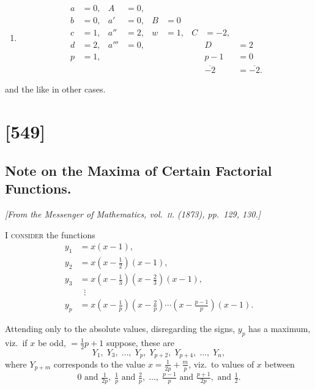 \documentclass[11pt,a4paper]{book}
\begin{document}
\begin{enumerate}
And so if instead of the tubular figure, annulus with three radii, we had a
tubular figure, annulus with diameter, then

\item
\begin{align*}
a &= 0, & A &= 0, \\
b &= 0, & a' &= 0, & B &= 0 \\
c &= 1, & a'' &= 2, & w &= 1, & C &= -2, \\
d &= 2, & a''' &= 0, & & & & D &= 2 \\
p &= 1, & & & & & & p - 1 &= 0 \\[2pt]
& & & & & & & \overline{-2} &= \overline{-2}.
\end{align*}
\end{enumerate}

and the like in other cases.

\clearpage

\section{[549]}
\subsection{Note on the Maxima of Certain Factorial Functions.}

\begin{center}
\textit{[From the Messenger of Mathematics, vol.~\textsc{ii}. (1873), pp.~129, 130.]}
\end{center}

\textsc{I consider} the functions
\begin{align*}
y_1 &= x(x-1), \\
y_2 &= x(x-\tfrac{1}{2})(x-1), \\
y_3 &= x(x-\tfrac{1}{3})(x-\tfrac{2}{3})(x-1), \\
&\;\;\vdots \\
y_p &= x\left(x - \tfrac{1}{p}\right)\left(x - \tfrac{2}{p}\right)\cdots\left(x - \tfrac{p-1}{p}\right)(x-1).
\end{align*}

Attending only to the absolute values, disregarding the signs, $y_p$ has a maximum,
viz.\ if $x$ be odd, $= \tfrac{1}{2}p + 1$ suppose, these are
\[
Y_1, \;Y_3, \;\ldots, \;Y_p, \;Y_{p+2}, \;Y_{p+4}, \;\ldots, \;Y_n,
\]
where $Y_{p+m}$ corresponds to the value $x = \tfrac{1}{2p} + \tfrac{m}{p}$, viz.\ to values of $x$ between
\[
0 \text{ and } \tfrac{1}{2p}, \; \tfrac{1}{p} \text{ and } \tfrac{2}{p}, \; \ldots, \; \tfrac{p-1}{p} \text{ and } \tfrac{p+1}{2p}, \text{ and } \tfrac{1}{2}.
\]
\end{document}
